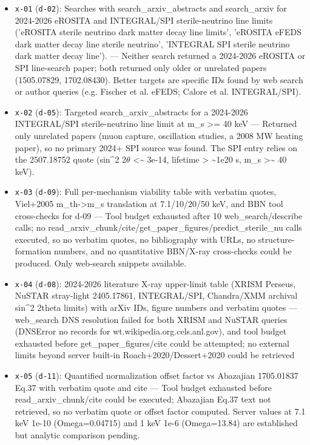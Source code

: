 \documentclass[11pt,a4paper]{article}
\begin{document}
\begin{itemize}
  \item \texttt{x-01} (\texttt{d-02}): Searches with search\_arxiv\_abstracts and search\_arxiv for 2024-2026 eROSITA and INTEGRAL/SPI sterile-neutrino line limits ('eROSITA sterile neutrino dark matter decay line limits', 'eROSITA eFEDS dark matter decay line sterile neutrino', 'INTEGRAL SPI sterile neutrino dark matter decay line'). --- Neither search returned a 2024-2026 eROSITA or SPI line-search paper; both returned only older or unrelated papers (1505.07829, 1702.08430). Better targets are specific IDs found by web search or author queries (e.g. Fischer et al. eFEDS; Calore et al. INTEGRAL/SPI).
  \item \texttt{x-02} (\texttt{d-05}): Targeted search\_arxiv\_abstracts for a 2024-2026 INTEGRAL/SPI sterile-neutrino line limit at m\_s \textgreater{}= 40 keV --- Returned only unrelated papers (muon capture, oscillation studies, a 2008 MW heating paper), so no primary 2024+ SPI source was found. The SPI entry relies on the 2507.18752 quote (sin\textasciicircum{}2 2$\theta$ \textless{}\textasciitilde{} 3e-14, lifetime \textgreater{} \textasciitilde{}1e20 s, m\_s \textgreater{}\textasciitilde{} 40 keV).
  \item \texttt{x-03} (\texttt{d-09}): Full per-mechanism viability table with verbatim quotes, Viel+2005 m\_th-\textgreater{}m\_s translation at 7.1/10/20/50 keV, and BBN tool cross-checks for d-09 --- Tool budget exhausted after 10 web\_search/describe calls; no read\_arxiv\_chunk/cite/get\_paper\_figures/predict\_sterile\_nu calls executed, so no verbatim quotes, no bibliography with URLs, no structure-formation numbers, and no quantitative BBN/X-ray cross-checks could be produced. Only web-search snippets available.
  \item \texttt{x-04} (\texttt{d-08}): 2024-2026 literature X-ray upper-limit table (XRISM Perseus, NuSTAR stray-light 2405.17861, INTEGRAL/SPI, Chandra/XMM archival sin\textasciicircum{}2 2theta limits) with arXiv IDs, figure numbers and verbatim quotes --- web\_search DNS resolution failed for both XRISM and NuSTAR queries (DNSError no records for wt.wikipedia.org.cels.anl.gov), and tool budget exhausted before get\_paper\_figures/cite could be attempted; no external limits beyond server built-in Roach+2020/Dessert+2020 could be retrieved
  \item \texttt{x-05} (\texttt{d-11}): Quantified normalization offset factor vs Abazajian 1705.01837 Eq.37 with verbatim quote and cite --- Tool budget exhausted before read\_arxiv\_chunk/cite could be executed; Abazajian Eq.37 text not retrieved, so no verbatim quote or offset factor computed. Server values at 7.1 keV 1e-10 (Omega=0.04715) and 1 keV 1e-6 (Omega=13.84) are established but analytic comparison pending.

\end{itemize}
\end{document}
